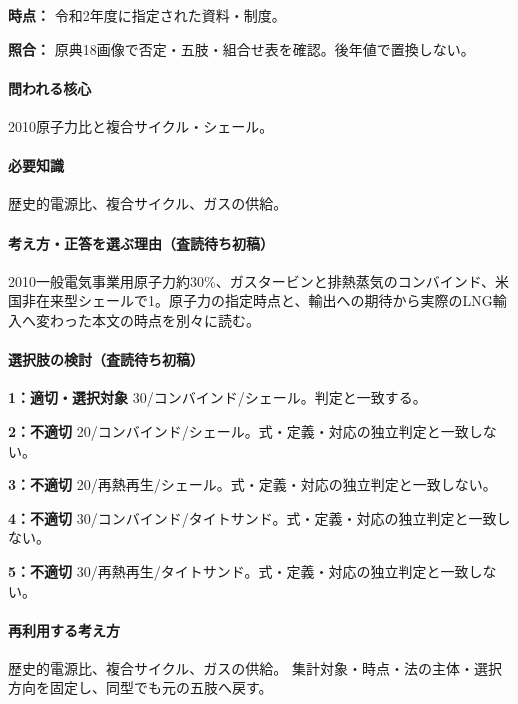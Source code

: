 \noindent\textbf{時点：} 令和2年度に指定された資料・制度。\par

\noindent\textbf{照合：} 原典18画像で否定・五肢・組合せ表を確認。後年値で置換しない。\par

\paragraph{問われる核心} 2010原子力比と複合サイクル・シェール。

\paragraph{必要知識} 歴史的電源比、複合サイクル、ガスの供給。

\paragraph{考え方・正答を選ぶ理由（査読待ち初稿）} 2010一般電気事業用原子力約30\%、ガスタービンと排熱蒸気のコンバインド、米国非在来型シェールで1。原子力の指定時点と、輸出への期待から実際のLNG輸入へ変わった本文の時点を別々に読む。

\paragraph{選択肢の検討（査読待ち初稿）}\mbox{}\par

\noindent\textbf{1：適切・選択対象} 30/コンバインド/シェール。判定と一致する。\par

\noindent\textbf{2：不適切} 20/コンバインド/シェール。式・定義・対応の独立判定と一致しない。\par

\noindent\textbf{3：不適切} 20/再熱再生/シェール。式・定義・対応の独立判定と一致しない。\par

\noindent\textbf{4：不適切} 30/コンバインド/タイトサンド。式・定義・対応の独立判定と一致しない。\par

\noindent\textbf{5：不適切} 30/再熱再生/タイトサンド。式・定義・対応の独立判定と一致しない。\par

\paragraph{再利用する考え方} 歴史的電源比、複合サイクル、ガスの供給。 集計対象・時点・法の主体・選択方向を固定し、同型でも元の五肢へ戻す。

